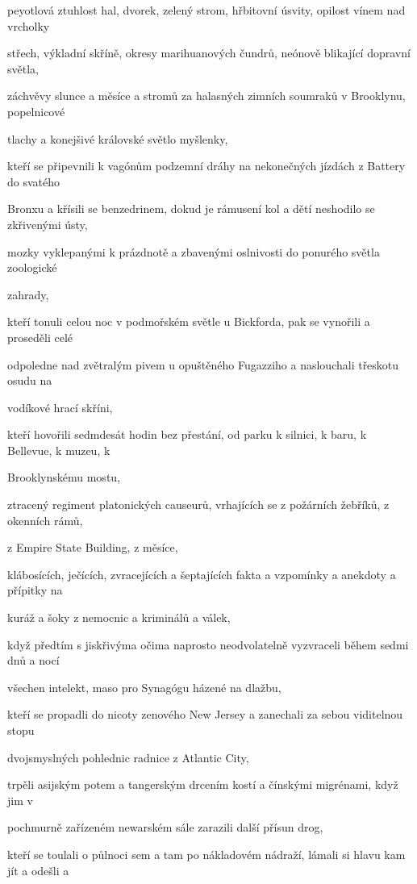 \documentclass[11pt]{article}
\begin{document}
\begin{center}
peyotlová ztuhlost hal, dvorek, zelený strom, hřbitovní úsvity, opilost vínem nad vrcholky

střech, výkladní skříně, okresy marihuanových čundrů, neónově blikající dopravní světla,

záchvěvy slunce a měsíce a stromů za halasných zimních soumraků v Brooklynu, popelnicové

tlachy a konejšivé královské světlo myšlenky,

kteří se připevnili k vagónům podzemní dráhy na nekonečných jízdách z Battery do svatého

Bronxu a křísili se benzedrinem, dokud je rámusení kol a dětí neshodilo se zkřivenými ústy,

mozky vyklepanými k prázdnotě a zbavenými oslnivosti do ponurého světla zoologické

zahrady,

kteří tonuli celou noc v podmořském světle u Bickforda, pak se vynořili a proseděli celé

odpoledne nad zvětralým pivem u opuštěného Fugazziho a naslouchali třeskotu osudu na

vodíkové hrací skříni,

kteří hovořili sedmdesát hodin bez přestání, od parku k silnici, k baru, k Bellevue, k muzeu, k

Brooklynskému mostu,

ztracený regiment platonických causeurů, vrhajících se z požárních žebříků, z okenních rámů,

z Empire State Building, z měsíce,

klábosících, ječících, zvracejících a šeptajících fakta a vzpomínky a anekdoty a přípitky na

kuráž a šoky z nemocnic a kriminálů a válek,

když předtím s jiskřivýma očima naprosto neodvolatelně vyzvraceli během sedmi dnů a nocí

všechen intelekt, maso pro Synagógu házené na dlažbu,

kteří se propadli do nicoty zenového New Jersey a zanechali za sebou viditelnou stopu

dvojsmyslných pohlednic radnice z Atlantic City,

trpěli asijským potem a tangerským drcením kostí a čínskými migrénami, když jim v

pochmurně zařízeném newarském sále zarazili další přísun drog,

kteří se toulali o půlnoci sem a tam po nákladovém nádraží, lámali si hlavu kam jít a odešli a


\end{center}
\end{document}
